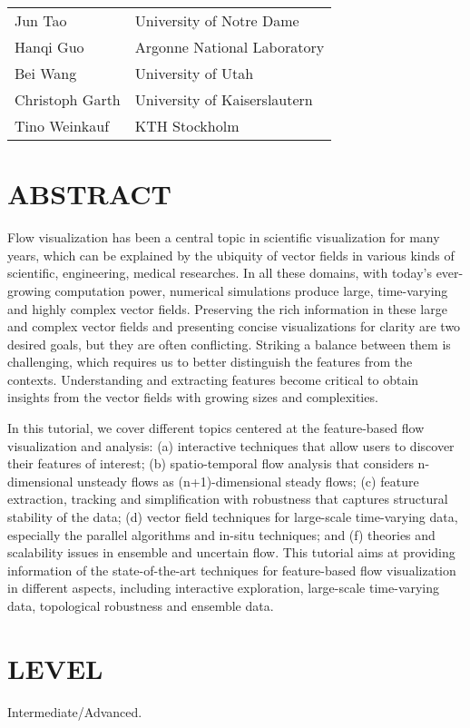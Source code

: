 \documentclass[preprint,journal]{vgtc}       %
\begin{document}
\vspace{-0.1in}
\begin{table}[H]
\begin{tabular}{ll}
Jun Tao & University of Notre Dame\\
Hanqi Guo & Argonne National Laboratory\\
Bei Wang & University of Utah\\
Christoph Garth & University of Kaiserslautern\\
Tino Weinkauf & KTH Stockholm
\end{tabular}
\end{table}

\section*{ABSTRACT}
Flow visualization has been a central topic in scientific visualization for many years, which can be explained by the ubiquity of vector fields in various kinds of scientific, engineering, medical researches. In all these domains, with today's ever-growing computation power, numerical simulations produce large, time-varying and highly complex vector fields. Preserving the rich information in these large and complex vector fields and presenting concise visualizations for clarity are two desired goals, but they are often conflicting. Striking a balance between them is challenging, which requires us to better distinguish the features from the contexts. Understanding and extracting features become critical to obtain insights from the vector fields with growing sizes and complexities.

In this tutorial, we cover different topics centered at the feature-based flow visualization and analysis: (a) interactive techniques that allow users to discover their features of interest; (b) spatio-temporal flow analysis that considers n-dimensional unsteady flows as (n+1)-dimensional steady flows; (c) feature extraction, tracking and simplification with robustness that captures structural stability of the data; (d) vector field techniques for large-scale time-varying data, especially the parallel algorithms and in-situ techniques; and (f) theories and scalability issues in ensemble and uncertain flow. This tutorial aims at providing information of the state-of-the-art techniques for feature-based flow visualization in different aspects, including interactive exploration, large-scale time-varying data, topological robustness and ensemble data.

\section*{LEVEL}
Intermediate/Advanced.
\end{document}
